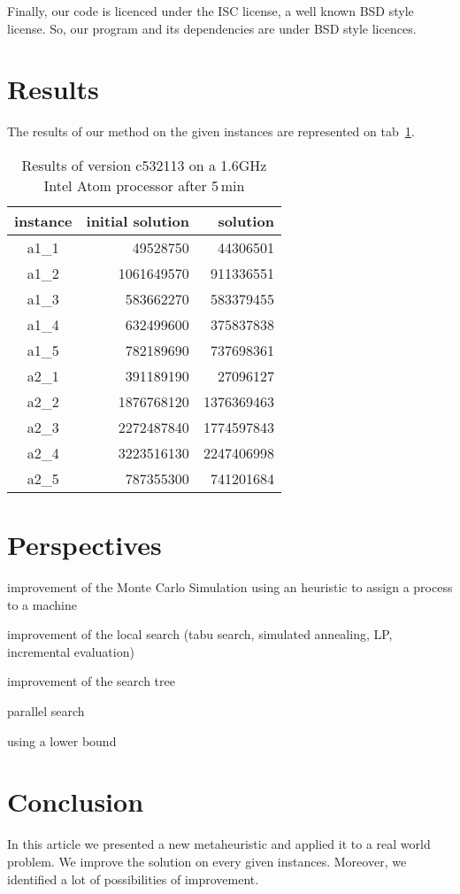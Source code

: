 \documentclass[a4paper,twocolumn]{article}
\begin{document}
Finally, our code is licenced under the ISC license, a well known BSD
style license.  So, our program and its dependencies are under BSD
style licences.

\section{Results}

The results of our method on the given instances are represented on
tab~\ref{tab:results}.

\begin{table}
  \centering
  \label{tab:results}
  \caption{Results of version c532113 on a 1.6GHz Intel Atom processor
    after 5\,min}
  \begin{tabular}{|c|r|r|}
    \hline
    instance & initial solution & solution\\
    \hline
    a1\_1 &   49528750 &   44306501\\
    a1\_2 & 1061649570 &  911336551\\
    a1\_3 &  583662270 &  583379455\\
    a1\_4 &  632499600 &  375837838\\
    a1\_5 &  782189690 &  737698361\\
    a2\_1 &  391189190 &   27096127\\
    a2\_2 & 1876768120 & 1376369463\\
    a2\_3 & 2272487840 & 1774597843\\
    a2\_4 & 3223516130 & 2247406998\\
    a2\_5 &  787355300 &  741201684\\
    \hline
  \end{tabular}
\end{table}

\section{Perspectives}

improvement of the Monte Carlo Simulation using an heuristic to assign
a process to a machine

improvement of the local search (tabu search, simulated annealing, LP,
incremental evaluation)

improvement of the search tree

parallel search

using a lower bound

\section{Conclusion}

In this article we presented a new metaheuristic and applied it to a
real world problem.  We improve the solution on every given
instances.  Moreover, we identified a lot of possibilities of
improvement.



\end{document}
